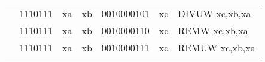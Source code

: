 \begin{table}[p]
\begin{small}
\begin{center}
\begin{tabular}{rcccccccccl}
&
\multicolumn{2}{|c|}{1110111} &
\multicolumn{1}{c|}{xa} &
\multicolumn{1}{c|}{xb} &
\multicolumn{4}{c|}{0010000101} &
\multicolumn{1}{c|}{xc} & DIVUW xc,xb,xa \\
\cline{2-10}
  

&
\multicolumn{2}{|c|}{1110111} &
\multicolumn{1}{c|}{xa} &
\multicolumn{1}{c|}{xb} &
\multicolumn{4}{c|}{0010000110} &
\multicolumn{1}{c|}{xc} & REMW xc,xb,xa \\
\cline{2-10}
  

&
\multicolumn{2}{|c|}{1110111} &
\multicolumn{1}{c|}{xa} &
\multicolumn{1}{c|}{xb} &
\multicolumn{4}{c|}{0010000111} &
\multicolumn{1}{c|}{xc} & REMUW xc,xb,xa \\
\cline{2-10}
  

\end{tabular}
\end{center}
\end{small}

\label{instr-table}
\end{table}
  

\newpage

